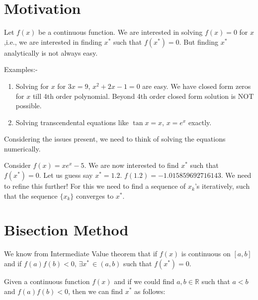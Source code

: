 \documentclass[
]{book}
\begin{document}
\hypertarget{motivation-3}{%
\section{Motivation}\label{motivation-3}}

Let \(f(x)\) be a continuous function. We are interested in solving \(f(x)=0\) for \(x\),i.e., we are interested in finding \(x^*\) such that \(f(x^*)=0\). But finding \(x^*\) analytically is not always easy.

Examples:-

\begin{enumerate}
\def\labelenumi{\arabic{enumi}.}
\item
  Solving for \(x\) for \(3x=9\), \(x^2+2x-1=0\) are easy. We have closed form zeros for \(x\) till 4th order polynomial. Beyond 4th order closed form solution is NOT possible.
\item
  Solving transcendental equations like \(\tan x = x\), \(x=e^x\) exactly.
\end{enumerate}

Considering the issues present, we need to think of solving the equations numerically.

Consider \(f(x) = xe^x-5\). We are now interested to find \(x^*\) such that \(f(x^*)=0\). Let us guess say \(x^*=1.2\). \(f(1.2) = -1.015859692716143\). We need to refine this further! For this we need to find a sequence of \(x_k\)'s iteratively, such that the sequence \(\{x_k\}\) converges to \(x^*\).

\hypertarget{bisection-method}{%
\section{Bisection Method}\label{bisection-method}}

We know from Intermediate Value theorem that if \(f(x)\) is continuous on \([a,b]\) and if \(f(a) f(b)<0\), \(\exists x^* \, \in(a,b)\) such that \(f(x^*)=0\).

Given a continuous function \(f(x)\) and if we could find \(a,b\in \mathbb{R}\) such that \(a<b\) and \(f(a) f(b)<0\), then we can find \(x^*\) as follows:
\end{document}
